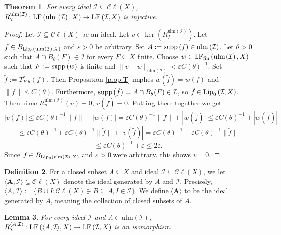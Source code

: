 \documentclass[12pt]{amsart}
\newtheorem{theorem}{Theorem}[section]
\newtheorem{lemma}[theorem]{Lemma}
\theoremstyle{definition}
\newtheorem{definition}[theorem]{Definition}
\numberwithin{equation}{section}
\def \I {\mathcal{I}}
\def \sbs {\subseteq}
\def \eps {\varepsilon}
\newcommand{\Cl}[1]{\mathcal{C}\ell\left(#1\right)}
\newcommand{\ulm}[1]{\mathrm{ulm}\left(#1\right)}
\begin{document}
\begin{theorem} \label{thm:injective}
For every ideal $\I \sbs \Cl{X}$, $R^{\ulm{\I}}_{\I}: \LF{\ulm{\I}}{X} \to \LF{\I}{X}$ is injective.
\end{theorem}

\begin{proof}
Let $\I \sbs \Cl{X}$ be an ideal. Let $v \in \ker(R^{\ulm{\I}}_{\I})$. Let \\ $f \in B_{\Lip{\ulm{\I}}{X}}$ and $\eps > 0$ be arbitrary. Set $A := \supp{f} \in \ulm{\I}$. Let $\theta > 0$ such that $A \cap B_\theta(F) \in \I$ for every $F \sbs X$ finite. Choose $w \in \LFf{\ulm{\I}}{X}$ such that $F := \supp{w}$ is finite and $\|v-w\|_{\ulm{\I}} < \eps C(\theta)^{-1}$. Set $\tilde{f} := T^*_{F,\theta}(f)$. Then Proposition \ref{prop:T} implies $w(\tilde{f}) = w(f)$ and $\|\tilde{f}\| \leq C(\theta)$. Furthermore, $\supp{\tilde{f}} = A \cap B_\theta(F) \in \I$, so $\tilde{f} \in \Lip{\I}{X}$. Then since $R^{\ulm{\I}}_{\I}(v) = 0$, $v(\tilde{f}) = 0$. Putting these together we get
$$|v(f)| \leq \eps C(\theta)^{-1}\|f\| + |w(f)| = \eps C(\theta)^{-1}\|f\| + |w(\tilde{f})| \leq \eps C(\theta)^{-1} + |w(\tilde{f})|$$
$$\leq \eps C(\theta)^{-1} + \eps C(\theta)^{-1}\|\tilde{f}\| + |v(\tilde{f})| = \eps C(\theta)^{-1} + \eps C(\theta)^{-1}\|\tilde{f}\|$$
$$\leq \eps C(\theta)^{-1} + \eps \leq 2\eps.$$
Since $f \in B_{\Lip{\ulm{\I}}{X}}$ and $\eps > 0$ were arbitrary, this shows $v = 0$.
\end{proof}

\begin{definition}
For a closed subset $A \sbs X$ and ideal $\I \sbs \Cl{X}$, we let $\boldsymbol{\langle A,\I \rangle} \sbs \Cl{X}$ denote the ideal generated by $A$ and $\I$. Precisely, $\langle A,\I \rangle := \{B \cup I: \Cl{X} \ni B \sbs A, I \in \I\}$. We define $\boldsymbol{\langle A \rangle}$ to be the ideal generated by $A$, meaning the collection of closed subsets of $A$.
\end{definition}

\begin{lemma} \label{lem:isomorphism}
For every ideal $\I$ and $A \in \ulm{\I}$, $R^{\langle A,\I \rangle}_\I: \LF{\langle A,\I \rangle}{X} \to \LF{\I}{X}$ is an isomorphism.
\end{lemma}
\end{document}
